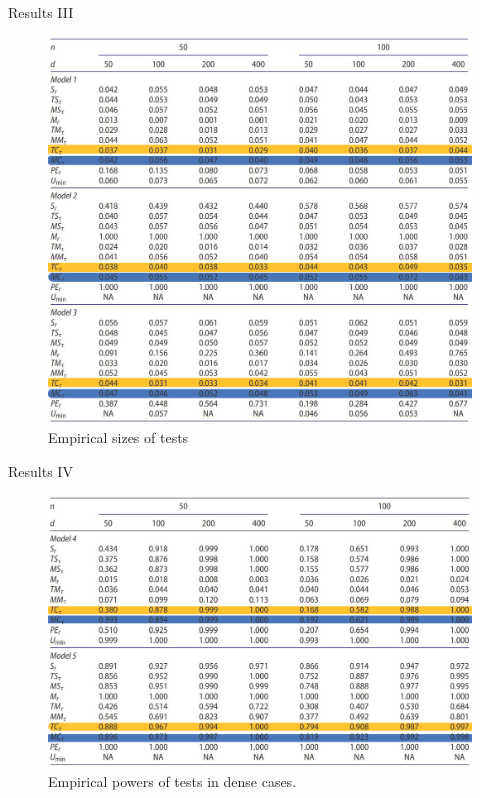\documentclass[
  ignorenonframetext,
]{beamer}
\begin{document}
\begin{frame}{Results III}
\label{results-iii}
\begin{figure}

{\centering \includegraphics[width=0.8\linewidth,height=0.77\textheight]{Figures/Table1H} 

}

\caption{Empirical sizes of tests}\label{fig:Table 1}
\end{figure}
\end{frame}

\begin{frame}{Results IV}
\label{results-iv}
\begin{figure}

{\centering \includegraphics[width=0.8\linewidth]{Figures/Table2H} 

}

\caption{Empirical powers of tests in dense cases.}\label{fig:Table 2}
\end{figure}
\end{frame}
\end{document}

